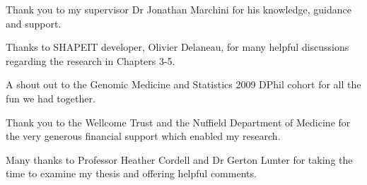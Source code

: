 \documentclass[twoside,openright,12pt]{ociamthesis}  %
\begin{document}
\begin{acknowledgements}
Thank you to my supervisor Dr Jonathan Marchini for his knowledge, guidance and support.

Thanks to SHAPEIT developer, Olivier Delaneau, for many helpful discussions regarding the research in Chapters 3-5.

A shout out to the Genomic Medicine and Statistics 2009 DPhil cohort for all the fun we had together.

Thank you to the Wellcome Trust and the Nuffield Department of
Medicine for the very generous financial support which enabled my
research.

Many thanks to Professor Heather Cordell and Dr Gerton Lunter for
taking the time to examine my thesis and offering helpful comments.
\end{acknowledgements}

\begin{romanpages}          %
\tableofcontents            %
\listoffigures              %
\listoftables
\end{romanpages}            %

\doublespacing













\end{document}
